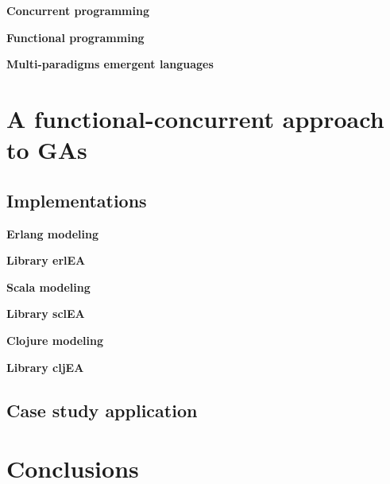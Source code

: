 \documentclass[a4paper]{llncs}
\newcommand{\simpleEntry}[1]
{
\vspace{.3cm}
\noindent \textbf{#1}
\vspace{.3cm}
}
\begin{document}
\simpleEntry{Concurrent programming}
    

\simpleEntry{Functional programming}
    

\simpleEntry{Multi-paradigms emergent languages}
    

\section{A functional-concurrent approach to GAs}
\label{sec:design}
    

\subsection{Implementations}
\label{sec:impl}
    

\simpleEntry{Erlang modeling}
    

\simpleEntry{Library erlEA}
    

\simpleEntry{Scala modeling}
    

\simpleEntry{Library sclEA}
    

\simpleEntry{Clojure modeling}
    

\simpleEntry{Library cljEA}
    

\subsection{Case study application}
    

\section{Conclusions}
\label{sec:conclusions}
    


%




\end{document}
